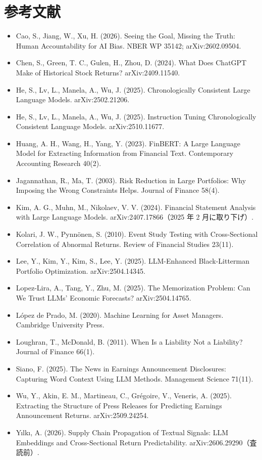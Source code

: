 \documentclass[xelatex,ja=standard,jafont=haranoaji,a4paper,10pt]{bxjsreport}
\begin{document}
\chapter*{参考文献}

\begin{itemize}\small
\item Cao, S., Jiang, W., Xu, H. (2026). Seeing the Goal, Missing the Truth: Human Accountability for AI Bias. NBER WP 35142; arXiv:2602.09504.
\item Chen, S., Green, T. C., Gulen, H., Zhou, D. (2024). What Does ChatGPT Make of Historical Stock Returns? arXiv:2409.11540.
\item He, S., Lv, L., Manela, A., Wu, J. (2025). Chronologically Consistent Large Language Models. arXiv:2502.21206.
\item He, S., Lv, L., Manela, A., Wu, J. (2025). Instruction Tuning Chronologically Consistent Language Models. arXiv:2510.11677.
\item Huang, A. H., Wang, H., Yang, Y. (2023). FinBERT: A Large Language Model for Extracting Information from Financial Text. Contemporary Accounting Research 40(2).
\item Jagannathan, R., Ma, T. (2003). Risk Reduction in Large Portfolios: Why Imposing the Wrong Constraints Helps. Journal of Finance 58(4).
\item Kim, A. G., Muhn, M., Nikolaev, V. V. (2024). Financial Statement Analysis with Large Language Models. arXiv:2407.17866（2025 年 2 月に取り下げ）.
\item Kolari, J. W., Pynnönen, S. (2010). Event Study Testing with Cross-Sectional Correlation of Abnormal Returns. Review of Financial Studies 23(11).
\item Lee, Y., Kim, Y., Kim, S., Lee, Y. (2025). LLM-Enhanced Black-Litterman Portfolio Optimization. arXiv:2504.14345.
\item Lopez-Lira, A., Tang, Y., Zhu, M. (2025). The Memorization Problem: Can We Trust LLMs' Economic Forecasts? arXiv:2504.14765.
\item López de Prado, M. (2020). Machine Learning for Asset Managers. Cambridge University Press.
\item Loughran, T., McDonald, B. (2011). When Is a Liability Not a Liability? Journal of Finance 66(1).
\item Siano, F. (2025). The News in Earnings Announcement Disclosures: Capturing Word Context Using LLM Methods. Management Science 71(11).
\item Wu, Y., Akin, E. M., Martineau, C., Grégoire, V., Veneris, A. (2025). Extracting the Structure of Press Releases for Predicting Earnings Announcement Returns. arXiv:2509.24254.
\item Yılkı, A. (2026). Supply Chain Propagation of Textual Signals: LLM Embeddings and Cross-Sectional Return Predictability. arXiv:2606.29290（査読前）.
\end{itemize}
\end{document}

